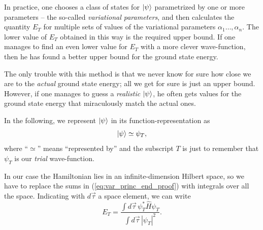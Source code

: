 \documentclass[a4paper,twoside,11pt]{book}
\begin{document}
In practice, one chooses a class of states for $\Ket{\psi}$ parametrized by one or more parameters -- the so-called \emph{variational parameters}, and then calculates the quantity $E_T$ for multiple sets of values of the variational parameters $\alpha_1\ldots,\alpha_n$. The lower value of $E_T$ obtained in this way is the required upper bound. If one manages to find an even lower value for $E_T$ with a more clever wave-function, then he has found a better upper bound for the ground state energy.

The only trouble with this method is that we never know for sure how close we are to the \emph{actual} ground state energy; all we get for sure is just an upper bound. However, if one manages to guess a \emph{realistic} $\Ket{\psi}$, he often gets values for the ground state energy that miraculously match the actual ones.

In the following, we represent $\Ket{\psi}$ in its function-representation as
\begin{equation*}
	\Ket{\psi} \simeq \psi_T,
\end{equation*}
where ``$\simeq$'' means ``represented by'' and the subscript $T$ is just to remember that $\psi_T$ is our \emph{trial} wave-function.

In our case the Hamiltonian lies in an infinite-dimension Hilbert space, so we have to replace the sums in (\ref{eq:var_princ_end_proof}) with integrals over all the space. Indicating with $d\vec{\tau}$ a space element, we can write
\begin{equation}
	E_T = \frac{\int d\vec{\tau} \, \psi_T^* \hat{H} \psi_T}{\int d\vec{\tau} \, |\psi_T|^2}.
	\label{eq:var_energy_integral}
\end{equation}
\end{document}
